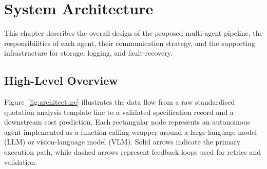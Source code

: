 \chapter{System Architecture}
\label{chapter:architecture}

% 
% 



This chapter describes the overall design of the proposed multi-agent pipeline, the responsibilities of each agent, their communication strategy, and the supporting infrastructure for storage, logging, and fault-recovery.

\section{High-Level Overview}

Figure~\ref{fig:architecture} illustrates the data flow from a raw standardised quotation analysis template line to a validated specification record and a downstream cost prediction.  
Each rectangular node represents an autonomous agent implemented as a function-calling wrapper around a large language model (LLM) or vision-language model (VLM).  
Solid arrows indicate the primary execution path, while dashed arrows represent feedback loops used for retries and validation.



